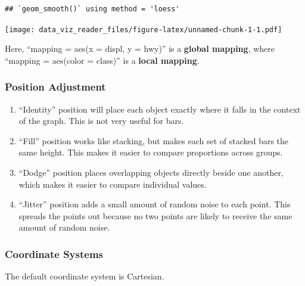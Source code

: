 \documentclass[]{book}
\providecommand{\tightlist}{%
  \setlength{\itemsep}{0pt}\setlength{\parskip}{0pt}}
\theoremstyle{definition}
\theoremstyle{definition}
\theoremstyle{definition}
\theoremstyle{remark}
\begin{document}
\begin{verbatim}
## `geom_smooth()` using method = 'loess'
\end{verbatim}

\texttt{[image: data\_viz\_reader\_files/figure-latex/unnamed-chunk-1-1.pdf]}

Here, ``mapping = aes(x = displ, y = hwy)'' is a \textbf{global
mapping}, where ``mapping = aes(color = class)'' is a \textbf{local
mapping}.

\subsubsection{Position Adjustment}\label{position-adjustment}

\begin{enumerate}
\def\labelenumi{\alph{enumi})}
\tightlist
\item
  ``Identity'' position will place each object exactly where it falls in
  the context of the graph. This is not very useful for bars.
\item
  ``Fill'' position works like stacking, but makes each set of stacked
  bars the same height. This makes it easier to compare proportions
  across groups.
\item
  ``Dodge'' position places overlapping objects directly beside one
  another, which makes it easier to compare individual values.
\item
  ``Jitter'' position adds a small amount of random noise to each point.
  This spreads the points out because no two points are likely to
  receive the same amount of random noise.
\end{enumerate}

\subsubsection{Coordinate Systems}\label{coordinate-systems}

The default coordinate system is Cartesian.
\end{document}

